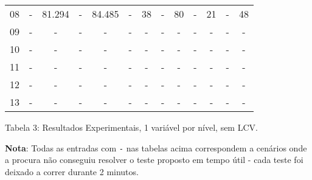 \documentclass[12pt,a4paper]{article}
\begin{document}
\begin{adjustbox}{width={\textwidth}, totalheight={\textheight}, keepaspectratio}
\begin{tabular}{l cccc cccc cccc}
            08    & -                                          & 81.294                          & -                                  & 84.485     & -   & 38   & -     & 80         & -   & 21   & -     & 48         \\
            09    & -                                          & -                               & -                                  & -          & -   & -    & -     & -          & -   & -    & -     & -          \\
            10    & -                                          & -                               & -                                  & -          & -   & -    & -     & -          & -   & -    & -     & -          \\
            11    & -                                          & -                               & -                                  & -          & -   & -    & -     & -          & -   & -    & -     & -          \\
            12    & -                                          & -                               & -                                  & -          & -   & -    & -     & -          & -   & -    & -     & -          \\
            13    & -                                          & -                               & -                                  & -          & -   & -    & -     & -          & -   & -    & -     & -          \\
            \bottomrule
      \end{tabular}
\end{adjustbox}

\vspace*{0.5cm}

\begin{center}
      Tabela 3: Resultados Experimentais, 1 variável por nível, sem LCV.
\end{center}

\vspace*{1cm}

\textbf{Nota}: Todas as entradas com \texttt{-} nas tabelas acima correspondem a
cenários onde a procura não conseguiu resolver o teste proposto em tempo útil - cada teste foi deixado a correr durante 2 minutos.
\end{document}

